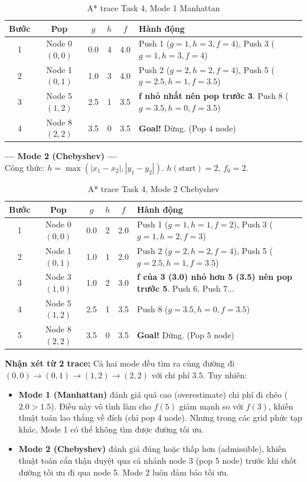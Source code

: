 \documentclass[13pt,a4paper]{article}
\begin{document}
\begin{table}[H]
\centering
\begin{tabular}{cccccp{5cm}}
\toprule
\textbf{Bước} & \textbf{Pop} & $g$ & $h$ & $f$ & \textbf{Hành động} \\
\midrule
1 & Node 0 $(0,0)$ & 0.0 & 4 & 4.0 & Push 1 ($g{=}1, h{=}3, f{=}4$), Push 3 ($g{=}1, h{=}3, f{=}4$) \\
2 & Node 1 $(0,1)$ & 1.0 & 3 & 4.0 & Push 2 ($g{=}2, h{=}2, f{=}4$), Push 5 ($g{=}2.5, h{=}1, f{=}3.5$) \\
3 & Node 5 $(1,2)$ & 2.5 & 1 & 3.5 & \textbf{f nhỏ nhất nên pop trước 3}. Push 8 ($g{=}3.5, h{=}0, f{=}3.5$) \\
4 & Node 8 $(2,2)$ & 3.5 & 0 & 3.5 & \textbf{Goal!} Dừng. (Pop 4 node) \\
\bottomrule
\end{tabular}
\caption{A* trace Task 4, Mode 1 Manhattan}
\end{table}

\textbf{--- Mode 2 (Chebyshev) ---} \\
Công thức: $h = \max(|x_1-x_2|, |y_1-y_2|)$. $h(\text{start}) = 2$, $f_0 = 2$.

\begin{table}[H]
\centering
\begin{tabular}{cccccp{5cm}}
\toprule
\textbf{Bước} & \textbf{Pop} & $g$ & $h$ & $f$ & \textbf{Hành động} \\
\midrule
1 & Node 0 $(0,0)$ & 0.0 & 2 & 2.0 & Push 1 ($g{=}1, h{=}1, f{=}2$), Push 3 ($g{=}1, h{=}2, f{=}3$) \\
2 & Node 1 $(0,1)$ & 1.0 & 1 & 2.0 & Push 2 ($g{=}2, h{=}2, f{=}4$), Push 5 ($g{=}2.5, h{=}1, f{=}3.5$) \\
3 & Node 3 $(1,0)$ & 1.0 & 2 & 3.0 & \textbf{f của 3 (3.0) nhỏ hơn 5 (3.5) nên pop trước 5}. Push 6, Push 7... \\
4 & Node 5 $(1,2)$ & 2.5 & 1 & 3.5 & Push 8 ($g{=}3.5, h{=}0, f{=}3.5$) \\
5 & Node 8 $(2,2)$ & 3.5 & 0 & 3.5 & \textbf{Goal!} Dừng. (Pop 5 node) \\
\bottomrule
\end{tabular}
\caption{A* trace Task 4, Mode 2 Chebyshev}
\end{table}

\textbf{Nhận xét từ 2 trace:} 
Cả hai mode đều tìm ra cùng đường đi $(0,0) \to (0,1) \to (1,2) \to (2,2)$ với chi phí $3.5$. Tuy nhiên:
\begin{itemize}
    \item \textbf{Mode 1 (Manhattan)} đánh giá quá cao (overestimate) chi phí đi chéo ($2.0 > 1.5$). Điều này vô tình làm cho $f(5)$ giảm mạnh so với $f(3)$, khiến thuật toán lao thẳng về đích (chỉ pop 4 node). Nhưng trong các grid phức tạp khác, Mode 1 có thể không tìm được đường tối ưu.
    \item \textbf{Mode 2 (Chebyshev)} đánh giá đúng hoặc thấp hơn (admissible), khiến thuật toán cẩn thận duyệt qua cả nhánh node 3 (pop 5 node) trước khi chốt đường tối ưu đi qua node 5. Mode 2 luôn đảm bảo tối ưu.
\end{itemize}
\end{document}
